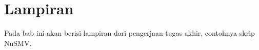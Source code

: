 \chapter*{Lampiran}

Pada bab ini akan berisi lampiran dari pengerjaan tugas akhir, contohnya skrip NuSMV.